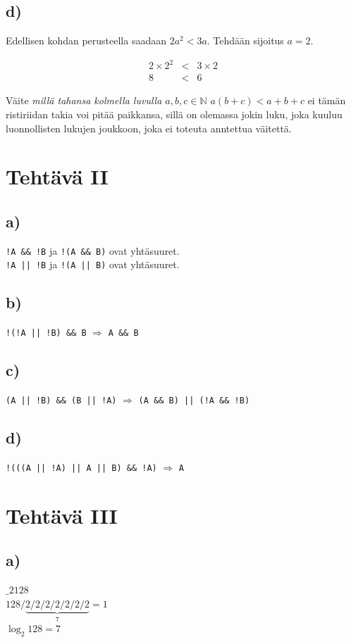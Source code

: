 \documentclass[a4paper, 12pt]{article}
\begin{document}
\subsection*{d)}
Edellisen kohdan perusteella saadaan $2a^2<3a$. Tehdään sijoitus $a=2$.
\begin{center}
\begin{eqnarray*}
2 \times 2^2 &<& 3 \times 2 \\
8 &<& 6
\end{eqnarray*}
\end{center}
Väite \emph{millä tahansa kolmella luvulla $a,b,c \in \mathbb{N}$   $a\left(b+c\right)<a+b+c$} ei tämän ristiriidan takia voi pitää paikkansa, sillä on olemassa jokin luku, joka kuuluu luonnollisten lukujen joukkoon, joka ei toteuta anntettua väitettä.

\section*{Tehtävä II}
\subsection*{a)}
\texttt{!A \&\& !B} ja \texttt{!(A \&\& B)} ovat yhtäsuuret. \\
\texttt{!A || !B} ja \texttt{!(A || B)} ovat yhtäsuuret.
\subsection*{b)}
\texttt{!(!A || !B) \&\& B} $\Rightarrow$ \texttt{A \&\& B}
\subsection*{c)}
\texttt{(A || !B) \&\& (B || !A)} $\Rightarrow$ \texttt{(A \&\& B) || (!A \&\& !B)}
\subsection*{d)}
\texttt{!(((A || !A) || A || B) \&\& !A)} $\Rightarrow$ \texttt{A}

\section*{Tehtävä III}
\subsection*{a)}
$\_{2}128$ \\
$128/\underbrace{2/2/2/2/2/2/2}_\text{7}=1$ \\
$\log_{2}128=7$
\end{document}
